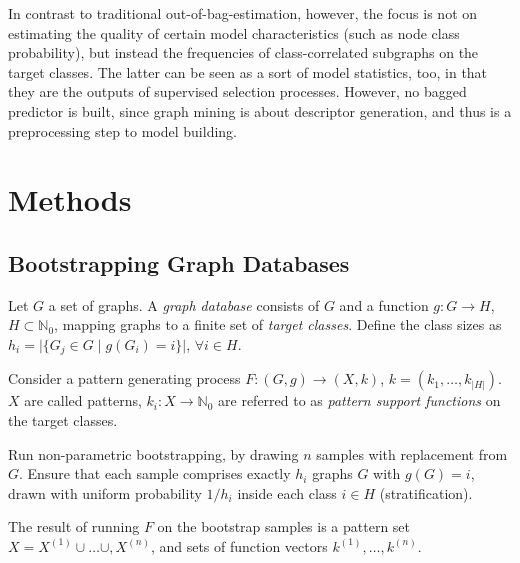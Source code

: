 \documentclass{article}
\begin{document}
In contrast to traditional out-of-bag-estimation, however, the focus is not on estimating the quality of certain model characteristics (such as node class probability), but instead the frequencies of class-correlated subgraphs on the target classes. The latter can be seen as a sort of model statistics, too, in that they are the outputs of supervised selection processes. However, no bagged predictor is built, since graph mining is about descriptor generation, and thus is a preprocessing step to model building.

\section{Methods}
\subsection{Bootstrapping Graph Databases}
Let $G$ a set of graphs. A \emph{graph database} consists of $G$ and a function $g: G \rightarrow H$, $H \subset \mathbb{N}_0$, mapping graphs to a finite set of \emph{target classes}. Define the class sizes as $h_i=\vert\{G_j \in G \; \vert\; g(G_i)=i\}\vert$, $\forall i \in H$.

Consider a pattern generating process $F: (G,g) \rightarrow (X,k)$, $k=\left(k_1,\ldots,k_{\vert H\vert}\right)$. $X$ are called patterns, $k_i: X \rightarrow \mathbb{N}_0$ are referred to as \emph{pattern support functions} on the target classes.

Run non-parametric bootstrapping, by drawing $n$ samples with replacement from $G$. Ensure that each sample comprises exactly $h_i$ graphs $G$ with $g(G)=i$, drawn with uniform probability $1/h_i$ inside each class $i \in H$ (stratification).

The result of running $F$ on the bootstrap samples is a pattern set $X= X^{(1)}\cup\ldots\cup,X^{(n)}$, and sets of function vectors $k^{(1)},\ldots,k^{(n)}$.
\end{document}
